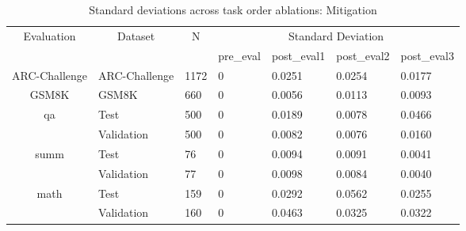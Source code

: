 \begin{table}[H]
\caption{Standard deviations across task order ablations: Mitigation}
\begin{tabular}{|c|l|l|llll|}
\hline
\multirow{2}{*}{Evaluation} & \multicolumn{1}{c|}{\multirow{2}{*}{Dataset}} & \multicolumn{1}{c|}{\multirow{2}{*}{N}} & \multicolumn{4}{c|}{Standard   Deviation}                                                                          \\ \cline{4-7} 
                            & \multicolumn{1}{c|}{}                         & \multicolumn{1}{c|}{}                                 & \multicolumn{1}{l|}{pre\_eval} & \multicolumn{1}{l|}{post\_eval1} & \multicolumn{1}{l|}{post\_eval2} & post\_eval3 \\ \hline
ARC-Challenge               & ARC-Challenge                                 & 1172                                                  & \multicolumn{1}{l|}{0}         & \multicolumn{1}{l|}{0.0251}      & \multicolumn{1}{l|}{0.0254}      & 0.0177      \\ \hline
GSM8K                       & GSM8K                                         & 660                                                   & \multicolumn{1}{l|}{0}         & \multicolumn{1}{l|}{0.0056}      & \multicolumn{1}{l|}{0.0113}      & 0.0093      \\ \hline
\multirow{2}{*}{qa}         & Test                                          & 500                                                   & \multicolumn{1}{l|}{0}         & \multicolumn{1}{l|}{0.0189}      & \multicolumn{1}{l|}{0.0078}      & 0.0466      \\ \cline{2-7} 
                            & Validation                                    & 500                                                   & \multicolumn{1}{l|}{0}         & \multicolumn{1}{l|}{0.0082}      & \multicolumn{1}{l|}{0.0076}      & 0.0160      \\ \hline
\multirow{2}{*}{summ}       & Test                                          & 76                                                    & \multicolumn{1}{l|}{0}         & \multicolumn{1}{l|}{0.0094}      & \multicolumn{1}{l|}{0.0091}      & 0.0041      \\ \cline{2-7} 
                            & Validation                                    & 77                                                    & \multicolumn{1}{l|}{0}         & \multicolumn{1}{l|}{0.0098}      & \multicolumn{1}{l|}{0.0084}      & 0.0040      \\ \hline
\multirow{2}{*}{math}       & Test                                          & 159                                                   & \multicolumn{1}{l|}{0}         & \multicolumn{1}{l|}{0.0292}      & \multicolumn{1}{l|}{0.0562}      & 0.0255      \\ \cline{2-7} 
                            & Validation                                    & 160                                                   & \multicolumn{1}{l|}{0}         & \multicolumn{1}{l|}{0.0463}      & \multicolumn{1}{l|}{0.0325}      & 0.0322      \\ \hline
\end{tabular}
\label{TraceMitigationStdDev}
\end{table}